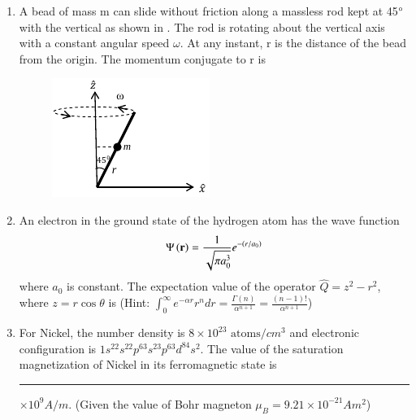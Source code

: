 \documentclass[journal,12pt,onecolumn]{IEEEtran}
\theoremstyle{remark}
\begin{document}
\begin{enumerate}
\item A bead of mass m can slide without friction along a massless rod kept at 45$\degree$ with the vertical as shown in . The rod is rotating about the vertical axis with a constant angular speed $\omega$. At any instant, r is the distance of the bead from the origin. The momentum conjugate to r is
\begin{figure}[H]
\centering
 \caption{} \label{fig:36} \includegraphics[width=0.3\columnwidth]{figs/q36.png}
\end{figure}
\hfill{} \begin{enumerate}  \end{enumerate}

\item An electron in the ground state of the hydrogen atom has the wave function $$\Psi\left(\mathbf{r}\right) = \frac{1}{\sqrt{\pi a_0^3}} e^{-\left(r/a_0\right)}$$ where $a_0$ is constant. The expectation value of the operator $\hat{Q} = z^2 - r^2$, where $z = r\cos\theta$ is (Hint: $\int_0^\infty e^{-\alpha r} r^n dr = \frac{\Gamma(n)}{\alpha^{n+1}} = \frac{(n-1)!}{\alpha^{n+1}}$)
\hfill{} \begin{enumerate}  \end{enumerate}

\item For Nickel, the number density is $8 \times 10^{23} \text{ atoms}/cm^3$ and electronic configuration is $1s^22s^22p^63s^23p^63d^84s^2$. The value of the saturation magnetization of Nickel in its ferromagnetic state is \rule{3cm}{0.4pt} $\times 10^9 A/m$. (Given the value of Bohr magneton $\mu_B = 9.21 \times 10^{-21} Am^2$)\hfill{}


\end{enumerate}
\end{document}
